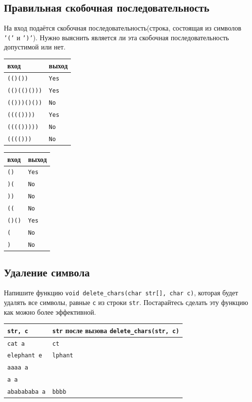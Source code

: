\documentclass{article}
\begin{document}
\subsection{Правильная скобочная последовательность}
На вход подаётся скобочная последовательность(строка, состоящая из символов \texttt{'('} и \texttt{')'}). Нужно выяснить является ли эта скобочная последовательность допустимой или нет.
\begin{multicols}{2}
\begin{center}
\begin{tabular}{ l | l }
 вход & выход \\ \hline
 \texttt{(()())} & \texttt{Yes} \\
 \texttt{(()(()()))} & \texttt{Yes} \\
 \texttt{(()))()())} & \texttt{No} \\
 \texttt{(((())))} & \texttt{Yes} \\
 \texttt{(((()))))} & \texttt{No} \\
 \texttt{(((()))} & \texttt{No} \\
\end{tabular}
\end{center}

\begin{center}
\begin{tabular}{ l | l }
 вход & выход \\ \hline
 \texttt{()} & \texttt{Yes} \\
 \texttt{)(} & \texttt{No} \\
 \texttt{))} & \texttt{No} \\
 \texttt{((} & \texttt{No} \\
 \texttt{()()} & \texttt{Yes} \\
 \texttt{(} & \texttt{No} \\
 \texttt{)} & \texttt{No} \\
\end{tabular}
\end{center}
\end{multicols}


\subsection{Удаление символа}
Напишите функцию \texttt{void delete\_chars(char str[], char c)}, которая будет удалять все символы, равные \texttt{c} из строки \texttt{str}. Постарайтесь сделать эту функцию как можно более эффективной.

\begin{center}
\begin{tabular}{ l | l }
 \texttt{str, c} & \texttt{str} после вызова \texttt{delete\_chars(str, c)} \\ \hline
 \texttt{cat a} & \texttt{ct} \\
 \texttt{elephant e} & \texttt{lphant} \\
 \texttt{aaaa a} & \texttt{} \\
 \texttt{a a} & \texttt{} \\
 \texttt{ababababa a} & \texttt{bbbb} \\
\end{tabular}
\end{center}
\end{document}
